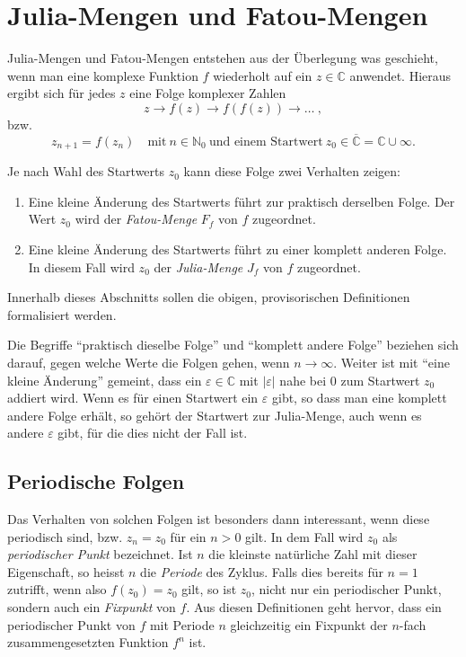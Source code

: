 \section{Julia-Mengen und Fatou-Mengen}
\label{julia:sec:julia}
%
Julia-Mengen und Fatou-Mengen entstehen aus der Überlegung was geschieht, wenn man eine komplexe Funktion $f$ wiederholt auf ein $z \in \mathbb{C}$ anwendet.
Hieraus ergibt sich für jedes $z$ eine Folge komplexer Zahlen
\begin{equation}
    z \rightarrow f(z) \rightarrow f(f(z)) \rightarrow \ldots \:,
    \label{julia:julia_folge}
\end{equation}
bzw.
\begin{equation*}
    z_{n + 1} = f(z_n) \quad \text{mit}\: n \in \mathbb{N}_0\: \text{und einem Startwert}\: z_0 \in \overline{\mathbb{C}} = \mathbb{C} \cup \infty.
\end{equation*}

Je nach Wahl des Startwerts $z_0$ kann diese Folge zwei Verhalten zeigen:
\begin{enumerate}
    \item Eine kleine Änderung des Startwerts führt zur praktisch derselben Folge. Der Wert $z_0$ wird der \emph{Fatou-Menge} $F_f$ von $f$ zugeordnet.
%
    \item Eine kleine Änderung des Startwerts führt zu einer komplett anderen Folge. In diesem Fall wird $z_0$ der \emph{Julia-Menge} $J_f$ von $f$ zugeordnet.
%
\end{enumerate}
Innerhalb dieses Abschnitts sollen die obigen, provisorischen Definitionen formalisiert werden.

Die Begriffe ``praktisch dieselbe Folge'' und ``komplett andere Folge'' beziehen sich darauf, gegen welche Werte die Folgen gehen, wenn $n \to \infty$.
Weiter ist mit ``eine kleine Änderung'' gemeint, dass ein $\varepsilon \in \mathbb{C}$ mit $|\varepsilon|$ nahe bei $0$ zum Startwert $z_0$ addiert wird.
Wenn es für einen Startwert ein $\varepsilon$ gibt, so dass man eine komplett andere Folge erhält, so gehört der Startwert zur Julia-Menge, auch wenn es andere $\varepsilon$ gibt, für die dies nicht der Fall ist.

\subsection{Periodische Folgen}
Das Verhalten von solchen Folgen ist besonders dann interessant, wenn diese periodisch sind, bzw. $z_n = z_0$ für ein $n > 0$ gilt.
In dem Fall wird $z_0$ als \emph{periodischer Punkt} bezeichnet.
%
Ist $n$ die kleinste natürliche Zahl mit dieser Eigenschaft, so heisst $n$ die \emph{Periode} des Zyklus.
%
Falls dies bereits für $n = 1$ zutrifft, wenn also $f(z_0) = z_0$ gilt, so ist $z_0$, nicht nur ein periodischer Punkt, sondern auch ein \emph{Fixpunkt} von $f$.
%
Aus diesen Definitionen geht hervor, dass ein periodischer Punkt von $f$ mit Periode $n$ gleichzeitig ein Fixpunkt der $n$-fach zusammengesetzten Funktion $f^n$ ist.

